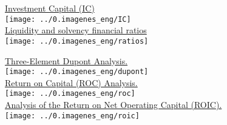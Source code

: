 \begin{center}
\underline{Investment Capital (IC)}\\[10pt]
\texttt{[image: ../0.imagenes\_eng/IC]}\\[10pt]

\underline{Liquidity and solvency financial ratios}\\[10pt]
\texttt{[image: ../0.imagenes\_eng/ratios]}\\[10pt]

\newpage

\underline{Three-Element Dupont Analysis.}\\[10pt]
\texttt{[image: ../0.imagenes\_eng/dupont]}\\[10pt]



\underline{Return on Capital (ROC) Analysis.}\\[10pt]
\texttt{[image: ../0.imagenes\_eng/roc]}\\[10pt]


\underline{Analysis of the Return on Net Operating Capital (ROIC).}\\[10pt]
\texttt{[image: ../0.imagenes\_eng/roic]}\\[10pt]
\end{center}